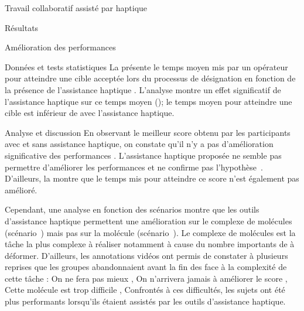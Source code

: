 \documentclass[myfrancais,ngerman,english,french]{mythesis}
\begin{document}
\begin{mychapter}{Travail collaboratif assisté par haptique}
\begin{mysection}{Résultats}
\begin{mysubsection}{Amélioration des performances}
\begin{mysubsubsection}{Données et tests statistiques}
					La  présente le temps moyen mis par un opérateur pour atteindre une cible acceptée lors du processus de désignation  en fonction de la présence de l'assistance haptique .
					L'analyse montre un effet significatif de l'assistance haptique  sur ce temps moyen  (); le temps moyen pour atteindre une cible est inférieur de  avec l'assistance haptique.
				\end{mysubsubsection}
				\begin{mysubsubsection}{Analyse et discussion}
					En observant le meilleur score  obtenu par les participants avec et sans assistance haptique, on constate qu'il n'y a pas d'amélioration significative des performances .
					L'assistance haptique proposée ne semble pas permettre d'améliorer les performances et ne confirme pas l'hypothèse~.
					D'ailleurs, la  montre que le temps mis pour atteindre ce score n'est également pas amélioré.

					Cependant, une analyse en fonction des scénarios montre que les outils d'assistance haptique permettent une amélioration sur le complexe de molécules \myNusENusG (scénario~) mais pas sur la molécule \myUbiquitin (scénario~).
					Le complexe de molécules \myNusENusG est la tâche la plus complexe à réaliser notamment à cause du nombre importants de  à déformer.
					D'ailleurs, les annotations vidéos ont permis de constater à plusieurs reprises que les groupes abandonnaient avant la fin des  face à la complexité de cette tâche : \og On ne fera pas mieux \fg, \og On n'arrivera jamais à améliorer le score \fg, \og Cette molécule est trop difficile \fg, \myetc
					Confrontés à ces difficultés, les sujets ont été plus performants lorsqu'ils étaient assistés par les outils d'assistance haptique.


\end{mysubsubsection}
\end{mysubsection}
\end{mysection}
\end{mychapter}
\end{document}
